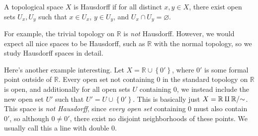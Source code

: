 \begin{definition}[Hausdorff]\label{dfn:1.7}
	A topological space $X$ is Hausdorff if for all distinct $x,y\in X$, there exist open sets $U_x,U_y$ such that $x\in U_x$, $y\in U_y$, and $U_x \cap U_y = \varnothing $.
\end{definition}

For example, the trivial topology on $\mathbb{R} $ is \emph{not} Hausdorff. However, we would expect all nice spaces to be Hausdorff, such as $\mathbb{R} $ with the normal topology, so we study Hausdorff spaces in detail.

Here's another example interesting. Let $X=\mathbb{R} \cup \left\{ 0' \right\} $, where $0'$ is some formal point outside of $\mathbb{R} $. Every open set not containing $0$ in the standard topology on $\mathbb{R} $ is open, and additionally for all open sets $U$ containing $0$,  we instead include the new open set $U'$ such that $U' = U \cup \left\{ 0' \right\} $. This is basically just $X= \mathbb{R} \amalg \mathbb{R} / \mathbin{\sim}  $. This space is \emph{not Hausdorff}, since \emph{every open set} containing $0$ must also contain $0'$, so although $0\neq 0'$, there exist no disjoint neighborhoods of these points. We usually call this a line with double 0.
